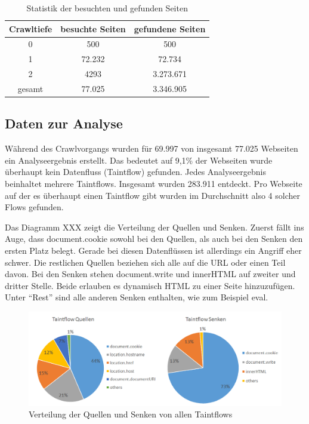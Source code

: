 \begin{table}
\centering
\begin{tabular}{|c|c|c|}
	\hline 
	Crawltiefe & besuchte Seiten & gefundene Seiten \\ 
	\hline 
	0 & 500 & 500 \\ 
	\hline 
	1 & 72.232 & 72.734 \\ 
	\hline 
	2 & 4293 & 3.273.671 \\ 
	\hline 
	\hline
	gesamt  & 77.025 & 3.346.905 \\ 
	\hline 
\end{tabular} 
\caption{Statistik der besuchten und gefunden Seiten}
\end{table}

\subsection{Daten zur Analyse}
Während des Crawlvorgangs wurden für 69.997 von insgesamt 77.025 Webseiten ein Analyseergebnis erstellt. Das bedeutet auf 9,1\% der Webseiten wurde überhaupt kein Datenfluss (Taintflow) gefunden. Jedes Analyseergebnis beinhaltet mehrere Taintflows. Insgesamt wurden 283.911 entdeckt. Pro Webseite auf der es überhaupt einen Taintflow gibt wurden im Durchschnitt also 4 solcher Flows gefunden. 

Das Diagramm XXX zeigt die Verteilung der Quellen und Senken. Zuerst fällt ins Auge, dass document.cookie sowohl bei den Quellen, als auch bei den Senken den ersten Platz belegt. Gerade bei diesen Datenflüssen ist allerdings ein Angriff eher schwer. Die restlichen Quellen beziehen sich alle auf die URL oder einen Teil davon. Bei den Senken stehen document.write und innerHTML auf zweiter und dritter Stelle. Beide erlauben es dynamisch HTML zu einer Seite hinzuzufügen. Unter \enquote{Rest} sind alle anderen Senken enthalten, wie zum Beispiel eval. 

\begin{figure}[h]
	\centering
	\includegraphics[width=1\textwidth]{Bilder/Diagram1.png}
	\caption{Verteilung der Quellen und Senken von allen Taintflows}
\end{figure}

